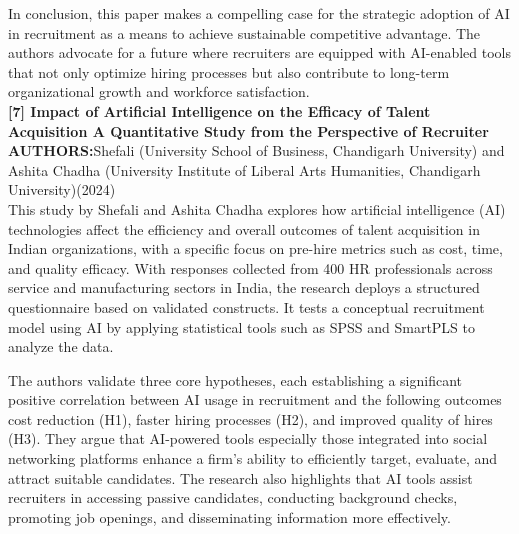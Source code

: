\documentclass[a4paper, 12pt]{report}
\begin{document}
In conclusion, this paper makes a compelling case for the strategic adoption of AI in recruitment as a means to achieve sustainable competitive advantage. The authors advocate for a future where recruiters are equipped with AI-enabled tools that not only optimize hiring processes but also contribute to long-term organizational growth and workforce satisfaction.\\
\noindent\textbf{[7] Impact of Artificial Intelligence on the Efficacy of Talent Acquisition A Quantitative Study from the Perspective of Recruiter}\\
 \textbf{AUTHORS:}Shefali (University School of Business, Chandigarh University) and Ashita Chadha (University Institute of Liberal Arts Humanities, Chandigarh University)(2024)\\
 This study by Shefali and Ashita Chadha explores how artificial intelligence (AI) technologies affect the efficiency and overall outcomes of talent acquisition in Indian organizations, with a specific focus on pre-hire metrics such as cost, time, and quality efficacy. With responses collected from 400 HR professionals across service and manufacturing sectors in India, the research deploys a structured questionnaire based on validated constructs. It tests a conceptual recruitment model using AI by applying statistical tools such as SPSS and SmartPLS to analyze the data.
 
The authors validate three core hypotheses, each establishing a significant positive correlation between AI usage in recruitment and the following outcomes cost reduction (H1), faster hiring processes (H2), and improved quality of hires (H3). They argue that AI-powered tools especially those integrated into social networking platforms enhance a firm’s ability to efficiently target, evaluate, and attract suitable candidates. The research also highlights that AI tools assist recruiters in accessing passive candidates, conducting background checks, promoting job openings, and disseminating information more effectively.
\end{document}
